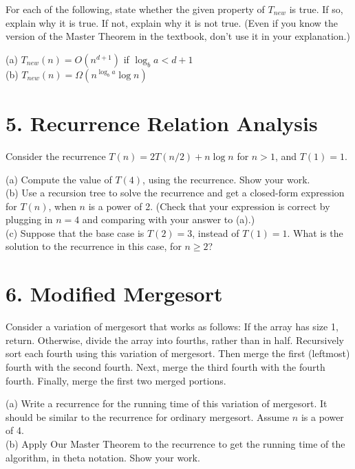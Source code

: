 \documentclass{article}
\begin{document}
For each of the following, state whether the given property of $T_{new}$ is true. If so, explain why it is true. If not, explain why it is not true. (Even if you know the version of the Master Theorem in the textbook, don’t use it in your explanation.)

(a) $T_{new}(n) = O(n^{d+1})$ if $\log_b a < d+1$ \\
(b) $T_{new}(n) = \Omega(n^{\log_b a} \log n)$


\section*{5. Recurrence Relation Analysis}
Consider the recurrence $T(n) = 2T(n/2) + n \log n$ for $n > 1$, and $T(1) = 1$.

(a) Compute the value of $T(4)$, using the recurrence. Show your work. \\
(b) Use a recursion tree to solve the recurrence and get a closed-form expression for $T(n)$, when $n$ is a power of 2. (Check that your expression is correct by plugging in $n = 4$ and comparing with your answer to (a).) \\
(c) Suppose that the base case is $T(2) = 3$, instead of $T(1) = 1$. What is the solution to the recurrence in this case, for $n \ge 2$?


\section*{6. Modified Mergesort}
Consider a variation of mergesort that works as follows: If the array has size 1, return. Otherwise, divide the array into fourths, rather than in half. Recursively sort each fourth using this variation of mergesort. Then merge the first (leftmost) fourth with the second fourth. Next, merge the third fourth with the fourth fourth. Finally, merge the first two merged portions.

(a) Write a recurrence for the running time of this variation of mergesort. It should be similar to the recurrence for ordinary mergesort. Assume $n$ is a power of 4. \\
(b) Apply Our Master Theorem to the recurrence to get the running time of the algorithm, in theta notation. Show your work.
\end{document}
